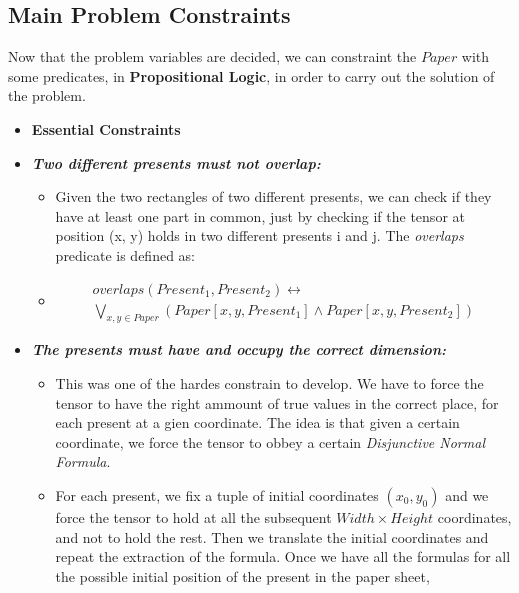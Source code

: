 \subsection{Main Problem Constraints}
Now that the problem variables are decided, we can constraint the $Paper$ with some predicates, in \textbf{Propositional Logic}, in order
to carry out the solution of the problem.

\begin{itemize}
    \item[] \textbf{Essential Constraints}
    \item \textbf{\textit{Two different presents must not overlap:}}
    \begin{itemize}
        \item[] Given the two rectangles of two different presents, we can check if they have
            at least one part in common, just by checking if the tensor at position (x, y)
            holds in two different presents i and j. The \textit{overlaps} predicate is defined as:
        \item[] \begin{equation*}\begin{multlined}
            overlaps(Present_1, Present_2) \leftrightarrow \\
            \bigvee_{x, y \in Paper}(Paper[x, y, Present_1] \wedge Paper[x, y, Present_2])
        \end{multlined}\end{equation*}
    \end{itemize}
    \item \textbf{\textit{The presents must have and occupy the correct dimension:}}
    \begin{itemize}
        \item[] This was one of the hardes constrain to develop. We have to force the tensor to have the right
            ammount of true values in the correct place, for each present at a gien coordinate. The idea is
            that given a certain coordinate, we force the tensor to obbey a certain \textit{Disjunctive Normal Formula}.
        \item[] For each present, we fix a tuple of initial coordinates $(x_0, y_0)$ and we force the tensor to hold at 
                all the subsequent $Width \times Height$ coordinates, and not to hold the rest.
                Then we translate the initial coordinates and repeat the extraction of the formula.
                Once we have all the formulas for all the possible initial position of the present in the paper sheet,

\end{itemize}
\end{itemize}
